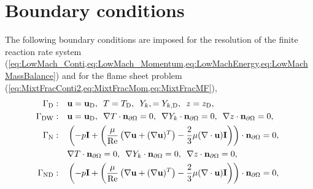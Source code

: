 \section{Boundary conditions}
The following boundary conditions are imposed for the resolution of the finite reaction rate system (\cref{eq:LowMach_Conti,eq:LowMach_Momentum,eq:LowMachEnergy,eq:LowMachMassBalance}) and for the flame sheet problem (\cref{eq:MixtFracConti2,eq:MixtFracMom,eq:MixtFracMF}),
\begin{subequations}
	\begin{align}
		\Gamma_{\text{D}}:\quad
		 & \vec{u} = \vec{u}_{\text{D}},
		\,\,\,
		T = T_{\text{D}},
		\,\,\,
		Y_{k}, =Y_{k,{\text{D}}},
		\,\,\,
		z = z_{\text{D}},
		\label{eq:bc_d}                                                                                                                                                                                             \\
		\Gamma_{{\text{DW}}}:\quad
		 & \vec{u} = \vec{u}_{\text{D}},
		\,\,\,
		\nabla T \cdot \vec{n}_{\partial \Omega} = 0,
		\,\,\,
		\nabla Y_{k} \cdot  \vec{n}_{\partial \Omega}= 0,
		\,\,\,
		\nabla z \cdot \vec{n}_{\partial \Omega} = 0,
		\label{eq:bc_dn}                                                                                                                                                                                            \\
		\Gamma_{\text{N}}: \quad
		 & \left( -p \mathbf{I}	+ \left(\frac{\mu}{\Reynolds} \left(\nabla \vec{u} + (\nabla \vec{u})^T\right) - \frac{2}{3}\mu(\nabla \cdot \vec{u})\mathbf{I}\right)\right)\cdot  \vec{n}_{\partial \Omega} 	= 0,
		\,\,\,\notag                                                                                                                                                                                                \\
		 &
		\nabla T \cdot \vec{n}_{\partial \Omega} = 0,
		\,\,\,
		\nabla  Y_{k} \cdot \vec{n}_{\partial \Omega}= 0,
		\,\,\,
		\nabla z \cdot \vec{n}_{\partial \Omega} = 0,
		\label{eq:bc_O}                                                                                                                                                                                             \\
		\Gamma_{\text{ND}}:\quad
		 & \left( -p \mathbf{I}	+ \left(\frac{\mu}{\Reynolds} \left(\nabla \vec{u} + (\nabla \vec{u})^T\right) - \frac{2}{3}\mu(\nabla \cdot \vec{u})\mathbf{I}\right)\right)\cdot  \vec{n}_{\partial \Omega} 	= 0,

\end{align}
\end{subequations}
